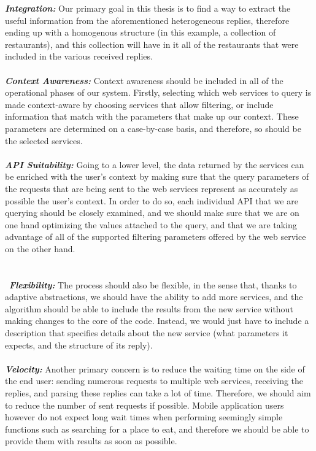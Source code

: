 \textbf{\textit{Integration:}} Our primary goal in this thesis is to find a way to extract the useful information from the aforementioned heterogeneous replies, therefore ending up with a homogenous structure (in this example, a collection of restaurants), and this collection will have in it all of the restaurants that were included in the various received replies.\\\\
\textbf{\textit{Context Awareness:}} Context awareness should be included in all of the operational phases of our system. Firstly, selecting which web services to query is made context-aware by choosing services that allow filtering, or include information that match with the parameters that make up our context. These parameters are determined on a case-by-case basis, and therefore, so should be the selected services.\\\\
\textbf{\textit{API Suitability:}} Going to a lower level, the data returned by the services can be enriched with the user's context by making sure that the query parameters of the requests that are being sent to the web services represent as accurately as possible the user's context. In order to do so, each individual API that we are querying should be closely examined, and we should make sure that we are on one hand optimizing the values attached to the query, and that we are taking advantage of all of the supported filtering parameters offered by the web service on the other hand.\\\\\\\
\textbf{\textit{Flexibility:}} The process should also be flexible, in the sense that, thanks to adaptive abstractions, we should have the ability to add more services, and the algorithm should be able to include the results from the new service without making changes to the core of the code. Instead, we would just have to include a description that specifies details about the new service (what parameters it expects, and the structure of its reply).\\\\
\textbf{\textit{Velocity:}} Another primary concern is to reduce the waiting time on the side of the end user: sending numerous requests to multiple web services, receiving the replies, and parsing these replies can take a lot of time. Therefore, we should aim to reduce the number of sent requests if possible. Mobile application users however do not expect long wait times when performing seemingly simple functions such as searching for a place to eat, and therefore we should be able to provide them with results as soon as possible.\\\\
